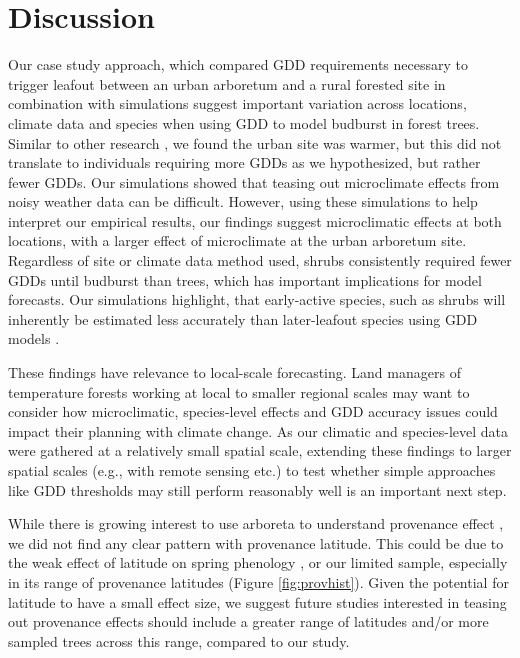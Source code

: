 \documentclass{article}\usepackage[]{graphicx}\usepackage[]{color}
\newcommand{\R}[1]{\label{#1}\linelabel{#1}}
\begin{document}
\section{Discussion} 
Our case study approach, which compared GDD requirements necessary to trigger leafout between an urban arboretum and a rural forested site in combination with simulations suggest important variation across locations, climate data and species when using GDD to model budburst in forest trees. Similar to other research \citep{Meng2020}, we found the urban site was warmer, but this did not translate to individuals requiring more GDDs as we hypothesized, but rather fewer GDDs. Our simulations showed that teasing out microclimate effects from noisy weather data can be difficult. However, using these simulations to help interpret our empirical results, our findings suggest microclimatic effects at both locations, with a larger effect of microclimate at the urban arboretum site. Regardless of site or climate data method used, shrubs consistently required fewer GDDs until budburst than trees, which has important implications for model forecasts. Our simulations highlight, that early-active species, such as shrubs will inherently be estimated less accurately than later-leafout species using GDD models \citep{Basler2016}. 

\R{Z1largespatialscale}These findings have relevance to local-scale forecasting. Land managers of temperature forests working at local to smaller regional scales may want to consider how microclimatic, species-level effects and GDD accuracy issues could impact their planning with climate change. As our climatic and species-level data were gathered at a relatively small spatial scale, extending these findings to larger spatial scales (e.g., with remote sensing etc.) to test whether simple approaches like GDD thresholds may still perform reasonably well is an important next step.\R{Z1scaleend}

While there is growing interest to use arboreta to understand provenance effect \citep{Primack2009}, we did not find any clear pattern with provenance latitude. This could be due to the weak effect of latitude on spring phenology \citep{Gauzere2017}, or our limited sample, especially in its range of provenance latitudes (Figure \ref{fig:provhist}). Given the potential for latitude to have a small effect size, we suggest future studies interested in teasing out provenance effects should include a greater range of latitudes and/or more sampled trees across this range, compared to our study. 
\end{document}
